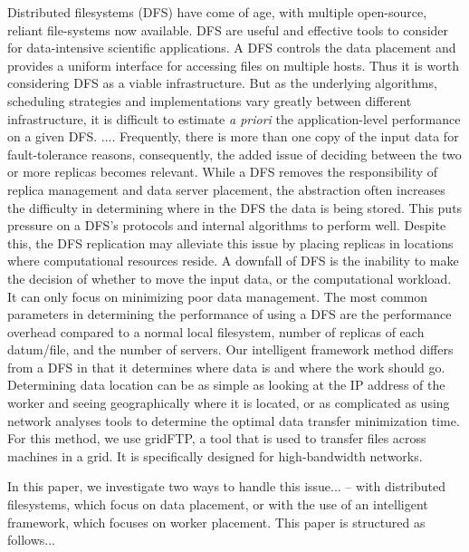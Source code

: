 \documentclass{rspublic}
\newcommand{\micnote}[1]{ {\textcolor{blue} { ***Michael: #1 }}}
\newcommand{\betynote}[1]{ {\textcolor{orange} { ***Bety: #1 }}}
\newcommand{\jhanote}[1]{} \newcommand{\micnote}[1]{}\newcommand{\betynote}[1]{} \newcommand{\fixme}[1]{}
\begin{document}
\jhanote{Compact. Simplify. Possibly move parts to later section; not
  in introduction} Distributed filesystems (DFS) have come of age,
with multiple open-source, reliant file-systems now available. DFS are
useful and effective tools to consider for data-intensive scientific
applications.  A DFS controls the data placement and provides a
uniform interface for accessing files on multiple hosts. Thus it is
worth considering DFS as a viable infrastructure. But as the
underlying algorithms, scheduling strategies and implementations vary
greatly between different infrastructure, it is difficult to estimate
{\it a priori} the application-level performance on a given DFS.
.... Frequently, there is more than one copy of the input data for
fault-tolerance reasons, consequently, the added issue of deciding
between the two or more replicas becomes relevant.  While a DFS
removes the responsibility of replica management and data server
placement, the abstraction often increases the difficulty in
determining where in the DFS the data is being stored. This puts
pressure on a DFS's protocols and internal algorithms to perform
well. Despite this, the DFS replication may alleviate this issue by
placing replicas in locations where computational resources reside. A
downfall of DFS is the inability to make the decision of whether to
move the input data, or the computational workload. It can only focus
on minimizing poor data management. The most common parameters in
determining the performance of using a DFS are the performance
overhead compared to a normal local filesystem, number of replicas of
each datum/file, and the number of servers.  Our intelligent framework
method differs from a DFS in that it determines where data is and
where the work should go.  Determining data location can be as simple
as looking at the IP address of the worker and seeing geographically
where it is located, or as complicated as using network analyses tools
to determine the optimal data transfer minimization time.  For this
method, we use gridFTP\jhanote{place proper citation for gridftp}, a
tool that is used to transfer files across machines in a grid. It is
specifically designed for high-bandwidth networks.
 
In this paper, we investigate two ways to handle this
issue... \jhanote{which issue?}  -- with distributed filesystems,
which focus on data placement, or with the use of an intelligent
framework, which focuses on worker placement. This paper is structured
as follows...
\end{document}
